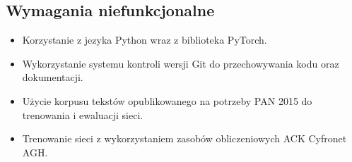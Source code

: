 \subsection{Wymagania niefunkcjonalne}
\begin{itemize}
 	\item Korzystanie z jezyka Python wraz z biblioteka PyTorch.
 	\item Wykorzystanie systemu kontroli wersji Git do przechowywania kodu oraz dokumentacji.
 	\item Użycie korpusu tekstów opublikowanego na potrzeby PAN 2015 do trenowania i ewaluacji sieci.
 	\item Trenowanie sieci z wykorzystaniem zasobów obliczeniowych ACK Cyfronet AGH.
\end{itemize}
